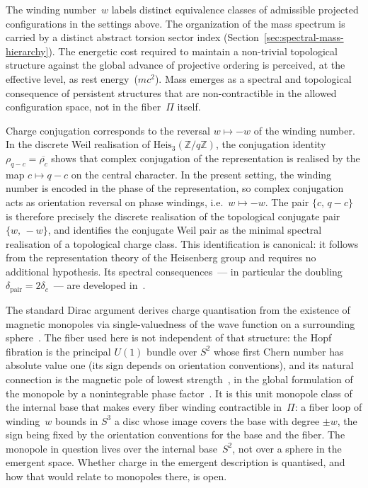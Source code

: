     The winding number~$w$ labels distinct equivalence classes of admissible
    projected configurations in the settings above.
    The organization of the mass spectrum is carried by a distinct abstract
    torsion sector index (Section~\ref{sec:spectral-mass-hierarchy}).
    The energetic cost required to maintain a non-trivial topological
    structure against the global advance of projective ordering is
    perceived, at the effective level, as rest energy~($mc^2$).
    Mass emerges as a spectral and topological consequence of persistent
    structures that are non-contractible in the allowed configuration space,
    not in the fiber~$\Pi$ itself.

    \begin{remark}
      \label{rem:winding-conjugation}
      Charge conjugation corresponds to the reversal $w \mapsto -w$ of the
      winding number.
      In the discrete Weil realisation of $\mathrm{Heis}_3(\mathbb{Z}/q\mathbb{Z})$,
      the conjugation identity $\rho_{q-c} = \overline{\rho_c}$ shows that
      complex conjugation of the representation is realised by the map
      $c \mapsto q - c$ on the central character.
      In the present setting, the winding number is encoded in the phase of
      the representation, so complex conjugation acts as orientation reversal
      on phase windings, i.e.\ $w \mapsto -w$.
      The pair $\{c,\, q-c\}$ is therefore precisely the discrete realisation of
      the topological conjugate pair $\{w,\,-w\}$, and identifies the conjugate
      Weil pair as the minimal spectral realisation of a topological charge class.
      This identification is canonical: it follows from the representation
      theory of the Heisenberg group and requires no additional hypothesis.
      Its spectral consequences~--- in particular the doubling
      $\delta_{\mathrm{pair}} = 2\delta_c$~--- are developed in~\cite{Beau2026a21,Beau2026k}.
    \end{remark}

    The standard Dirac argument derives charge quantisation from the existence of
    magnetic monopoles via single-valuedness of the wave function on a surrounding
    sphere~\cite{Dirac1931}.
    The fiber used here is not independent of that structure: the Hopf fibration
    is the principal $U(1)$ bundle over $S^2$ whose first Chern number has
    absolute value one (its sign depends on orientation conventions), and its
    natural connection is the magnetic pole of lowest
    strength~\cite{Trautman1977}, in the global formulation of the monopole by a
    nonintegrable phase factor~\cite{WuYang1975}.
    It is this unit monopole class of the internal base that makes every fiber
    winding contractible in~$\Pi$: a fiber loop of winding~$w$ bounds in $S^3$ a
    disc whose image covers the base with degree $\pm w$, the sign being fixed by the
    orientation conventions for the base and the fiber.
    The monopole in question lives over the internal base~$S^2$, not over a sphere
    in the emergent space.
    Whether charge in the emergent description is quantised, and how that would
    relate to monopoles there, is open.

